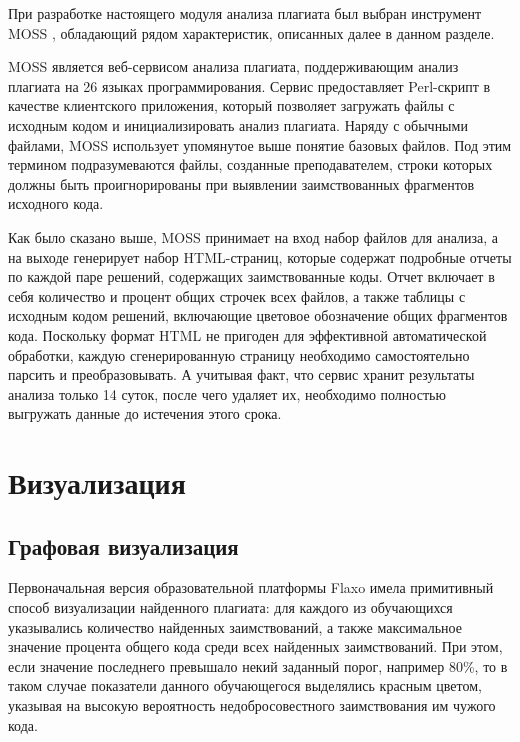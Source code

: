 \documentclass[a4paper,14pt]{extarticle}
\begin{document}
При разработке настоящего модуля анализа плагиата был выбран инструмент MOSS \citep{mossOriginalPaper}, обладающий рядом характеристик, описанных далее в данном разделе.

MOSS является веб-сервисом анализа плагиата, поддерживающим анализ плагиата на 26 языках программирования. Сервис предоставляет Perl-скрипт в качестве клиентского приложения, который позволяет загружать файлы с исходным кодом и инициализировать анализ плагиата. Наряду с обычными файлами, MOSS использует упомянутое выше понятие базовых файлов. Под этим термином подразумеваются файлы, созданные преподавателем, строки которых должны быть проигнорированы при выявлении заимствованных фрагментов исходного кода.

Как было сказано выше, MOSS принимает на вход набор файлов для анализа, а на выходе генерирует набор HTML-страниц, которые содержат подробные отчеты по каждой паре решений, содержащих заимствованные коды. Отчет включает в себя количество и процент общих строчек всех файлов, а также таблицы с исходным кодом решений, включающие цветовое обозначение общих фрагментов кода. Поскольку формат HTML не пригоден для эффективной автоматической обработки, каждую сгенерированную страницу необходимо самостоятельно парсить и преобразовывать. А учитывая факт, что сервис хранит результаты анализа только 14 суток, после чего удаляет их, необходимо полностью выгружать данные до истечения этого срока.

\section{Визуализация}

\subsection{Графовая визуализация}

Первоначальная версия образовательной платформы Flaxo имела примитивный способ визуализации найденного плагиата: для каждого из обучающихся указывались количество найденных заимствований, а также максимальное значение процента общего кода среди всех найденных заимствований. При этом, если значение последнего превышало некий заданный порог, например 80\%, то в таком случае показатели данного обучающегося выделялись красным цветом, указывая на высокую вероятность недобросовестного заимствования им чужого кода.
\end{document}
